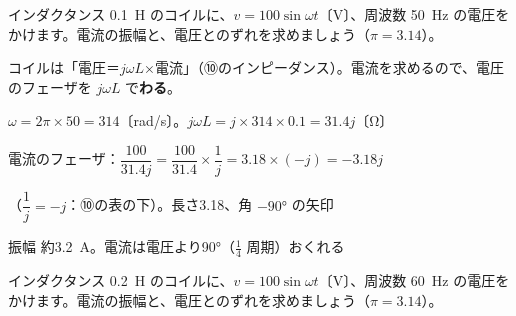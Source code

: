 \begin{reidai}
インダクタンス \qty{0.1}{H} のコイルに、$v=100\sin\omega t$〔V〕、周波数 \qty{50}{Hz} の電圧をかけます。電流の振幅と、電圧とのずれを求めましょう（$\pi=3.14$）。\par
\kangaekata コイルは「電圧＝$j\omega L$×電流」（⑩のインピーダンス）。電流を求めるので、電圧のフェーザを $j\omega L$ で\textbf{わる}。\par
\shiki{}\zw{} $\omega=2\pi\times50=314$〔rad/s〕。$j\omega L=j\times314\times0.1=31.4j$〔Ω〕\par
\bkvika 電流のフェーザ：$\dfrac{100}{31.4j}=\dfrac{100}{31.4}\times\dfrac{1}{j}=3.18\times(-j)=-3.18j$\par
\bkvika （$\dfrac{1}{j}=-j$：⑩の表の下）。長さ3.18、角 $-90°$ の矢印\par
\kotae{}\zw{} 振幅 約\qty{3.2}{A}。電流は電圧より90°（$\frac{1}{4}$ 周期）おくれる
\end{reidai}

\begin{jibun}
インダクタンス \qty{0.2}{H} のコイルに、$v=100\sin\omega t$〔V〕、周波数 \qty{60}{Hz} の電圧をかけます。電流の振幅と、電圧とのずれを求めましょう（$\pi=3.14$）。
\end{jibun}

